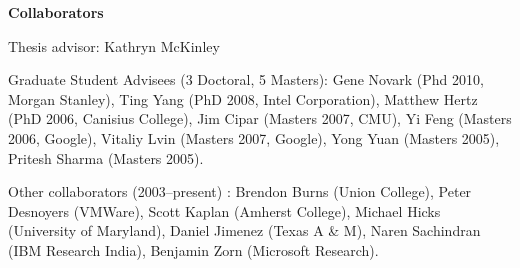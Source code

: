\documentclass[11pt]{article}
\begin{document}
\begin{description}
\setlength{\labelsep}{0ex}
\setlength{\itemsep}{-0.5ex}

\item {\bf\textsf{Collaborators}}

\item { Thesis advisor}: Kathryn McKinley

\item { Graduate Student Advisees} (3 Doctoral, 5 Masters): Gene Novark (Phd 2010, Morgan Stanley), Ting Yang (PhD 2008, Intel Corporation), Matthew Hertz (PhD 2006, Canisius College), Jim Cipar (Masters 2007, CMU), Yi Feng (Masters 2006, Google), Vitaliy Lvin (Masters 2007, Google), Yong Yuan (Masters 2005), Pritesh Sharma (Masters 2005).

\item {Other collaborators (2003--present)} : Brendon Burns (Union College), Peter Desnoyers (VMWare), Scott Kaplan (Amherst College), Michael Hicks (University of Maryland), Daniel Jimenez (Texas A \& M), Naren Sachindran (IBM Research India), Benjamin Zorn (Microsoft Research).

\end{description}
\end{document}
